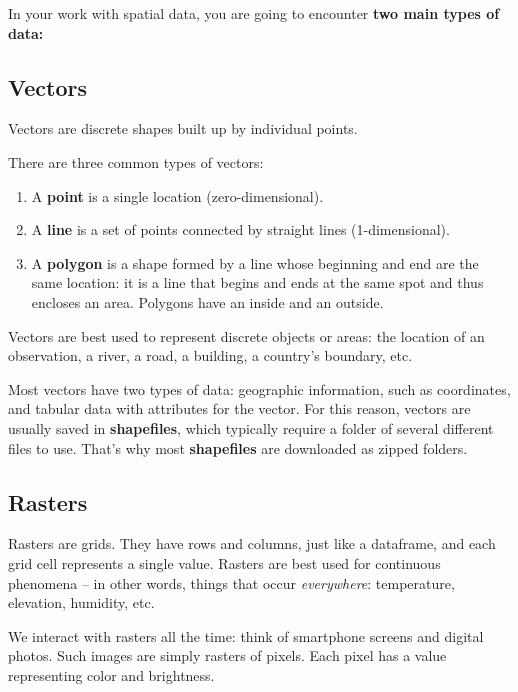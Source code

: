 \documentclass[]{book}
\begin{document}
In your work with spatial data, you are going to encounter \textbf{two main types of data:}

\hypertarget{vectors-1}{%
\subsection*{Vectors}\label{vectors-1}}

Vectors are discrete shapes built up by individual points.

There are three common types of vectors:

\begin{enumerate}
\def\labelenumi{(\arabic{enumi})}
\item
  A \textbf{point} is a single location (zero-dimensional).
\item
  A \textbf{line} is a set of points connected by straight lines (1-dimensional).
\item
  A \textbf{polygon} is a shape formed by a line whose beginning and end are the same location: it is a line that begins and ends at the same spot and thus encloses an area. Polygons have an inside and an outside.
\end{enumerate}

Vectors are best used to represent discrete objects or areas: the location of an observation, a river, a road, a building, a country's boundary, etc.

Most vectors have two types of data: geographic information, such as coordinates, and tabular data with attributes for the vector. For this reason, vectors are usually saved in \textbf{shapefiles}, which typically require a folder of several different files to use. That's why most \textbf{shapefiles} are downloaded as zipped folders.

\hypertarget{rasters}{%
\subsection*{Rasters}\label{rasters}}

Rasters are grids. They have rows and columns, just like a dataframe, and each grid cell represents a single value. Rasters are best used for continuous phenomena -- in other words, things that occur \emph{everywhere}: temperature, elevation, humidity, etc.

We interact with rasters all the time: think of smartphone screens and digital photos. Such images are simply rasters of pixels. Each pixel has a value representing color and brightness.
\end{document}
